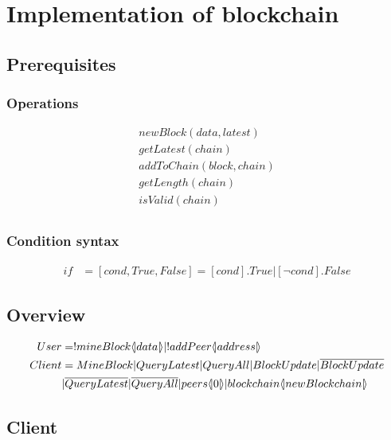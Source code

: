 \section{Implementation of blockchain}

\subsection{Prerequisites}

\subsubsection{Operations}

\begin{align*}
    newBlock(data,latest)\\
    getLatest(chain)\\
    addToChain(block,chain)\\
    getLength(chain)\\
    isValid(chain)\\
\end{align*}

\subsubsection{Condition syntax}

\begin{align*}
    if &= [cond,True,False] = [cond].True|[\neg cond].False
\end{align*}

\subsection{Overview}

\begin{align*}
    User &= !mineBlock \lift{}{data} |!addPeer\lift{}{address}\\
    Client &= MineBlock|QueryLatest|QueryAll|BlockUpdate|\overline{BlockUpdate}\\
    &|\overline{QueryLatest}|\overline{QueryAll}|peers\lift{}{0}|blockchain\lift{}{newBlockchain}
\end{align*}

\subsection{Client}

